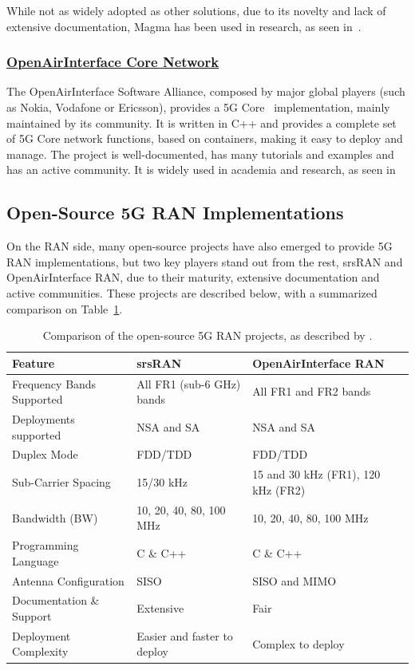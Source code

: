 While not as widely adopted as other solutions, due to its novelty and lack of extensive documentation, Magma has been used in research, as seen in~\cite{hasan2023building}.
\subsubsection*{\normalfont\uline{OpenAirInterface Core Network}}
\label{sec:openairinterface}

The OpenAirInterface Software Alliance, composed by major global players (such as Nokia, Vodafone or Ericsson), provides a 5G Core~\cite{oai_core_repo} implementation, mainly maintained by its community. It is written in C++  and provides a complete set of 5G Core network functions, based on containers, making it easy to deploy and manage. The project is well-documented, has many tutorials and examples and has an active community. It is widely used in academia and research, as seen in \cites{bonati2025_5gct}{horstmann2025open5gcube}{vazquez2024maq5g}


\subsection{Open-Source 5G RAN Implementations}
\label{sec:open_source_5g_ran_implementations}
On the \gls{RAN} side, many open-source projects have also emerged to provide 5G \gls{RAN} implementations, but two key players stand out from the rest, srsRAN and OpenAirInterface \gls{RAN}, due to their maturity, extensive documentation and active communities. These projects are described below, with a summarized comparison on Table~\ref{tab:5gran_implementations}.

\begin{table}[htbp]
\centering
\footnotesize
\renewcommand{\arraystretch}{1.5}
\begin{tabularx}{\textwidth}{|l|X|X|}
\hline
\rowcolor{gray!30} 
\textbf{Feature} & \textbf{srsRAN} & \textbf{OpenAirInterface \gls{RAN}} \\ \hline
Frequency Bands Supported & All FR1 (sub-6 GHz) bands & All FR1 and FR2 bands \\ \hline
Deployments supported & NSA and SA & NSA and SA \\ \hline
Duplex Mode & FDD/TDD & FDD/TDD \\ \hline
Sub-Carrier Spacing & 15/30 kHz & 15 and 30 kHz (FR1), 120 kHz (FR2) \\ \hline
Bandwidth (BW) & 10, 20, 40, 80, 100 MHz & 10, 20, 40, 80, 100 MHz \\ \hline
Programming Language & C \& C++ & C \& C++ \\ \hline
Antenna Configuration & SISO & SISO and MIMO \\ \hline
Documentation \& Support & Extensive & Fair \\ \hline
Deployment Complexity & Easier and faster to deploy & Complex to deploy \\ \hline
\end{tabularx}
\caption{Comparison of the open-source 5G RAN projects, as described by \textcite{mamushiane2023deploying}.}
\label{tab:5gran_implementations}
\end{table}

